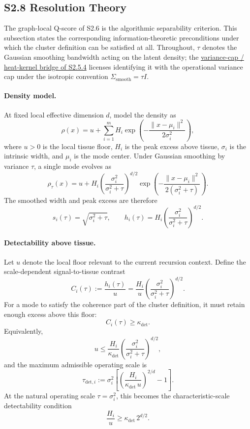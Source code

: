 \documentclass[11pt]{article}
\begin{document}
\subsection*{S2.8 Resolution Theory}
\label{sec:si-resolution-theory}
The graph-local Q-score of S2.6 is the algorithmic separability criterion. This
subsection states the corresponding information-theoretic preconditions under
which the cluster definition can be satisfied at all. Throughout, $\tau$ denotes
the Gaussian smoothing bandwidth acting on the latent density; the
\hyperref[sec:si-tau-heat-bridge]{variance-cap / heat-kernel bridge of S2.5.4}
licenses identifying it with the operational variance cap under the isotropic
convention $\Sigma_{\mathrm{smooth}}=\tau I$.

\paragraph{Density model.}
At fixed local effective dimension $d$, model the density as
\[
\rho(x)=u+\sum_{i=1}^m H_i
\exp\!\left(-\frac{\|x-\mu_i\|^2}{2\sigma_i^2}\right),
\]
where $u>0$ is the local tissue floor, $H_i$ is the peak excess above tissue,
$\sigma_i$ is the intrinsic width, and $\mu_i$ is the mode center. Under
Gaussian smoothing by variance $\tau$, a single mode evolves as
\[
\rho_\tau(x)=
u+
H_i\left(\frac{\sigma_i^2}{\sigma_i^2+\tau}\right)^{d/2}
\exp\!\left(
-\frac{\|x-\mu_i\|^2}{2(\sigma_i^2+\tau)}
\right).
\]
The smoothed width and peak excess are therefore
\[
s_i(\tau)=\sqrt{\sigma_i^2+\tau},
\qquad
h_i(\tau)=
H_i\left(\frac{\sigma_i^2}{\sigma_i^2+\tau}\right)^{d/2}.
\]

\paragraph{Detectability above tissue.}
Let $u$ denote the local floor relevant to the current recursion context. Define
the scale-dependent signal-to-tissue contrast
\[
C_i(\tau):=\frac{h_i(\tau)}{u}
=
\frac{H_i}{u}
\left(\frac{\sigma_i^2}{\sigma_i^2+\tau}\right)^{d/2}.
\]
For a mode to satisfy the coherence part of the cluster definition, it must
retain enough excess above this floor:
\[
C_i(\tau)\ge\kappa_{\mathrm{det}}.
\]
Equivalently,
\[
u\le
\frac{H_i}{\kappa_{\mathrm{det}}}
\left(\frac{\sigma_i^2}{\sigma_i^2+\tau}\right)^{d/2},
\]
and the maximum admissible operating scale is
\[
\tau_{\mathrm{det},i}
:=
\sigma_i^2
\left[
\left(\frac{H_i}{\kappa_{\mathrm{det}}\,u}\right)^{2/d}-1
\right].
\]
At the natural operating scale $\tau=\sigma_i^2$, this becomes the
characteristic-scale detectability condition
\[
\frac{H_i}{u}\ge \kappa_{\mathrm{det}}\,2^{d/2}.
\]
\end{document}
